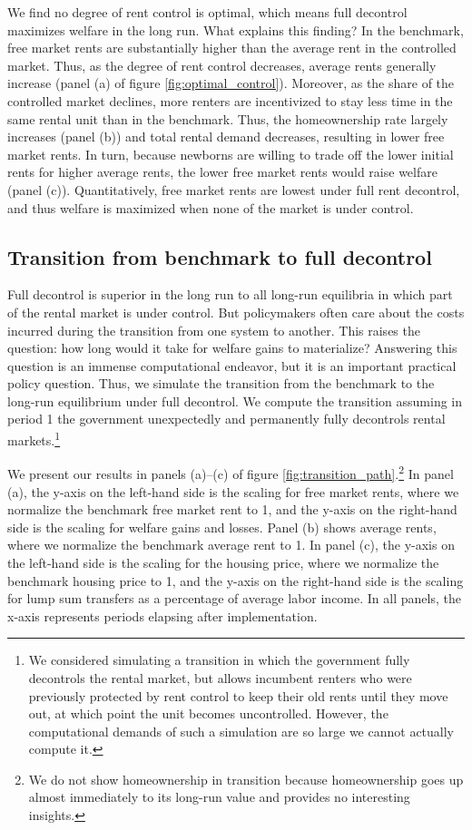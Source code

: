 \documentclass[parskip=full]{article}
\begin{document}
We find no degree of rent control is optimal, which means full decontrol maximizes welfare in the long run. What explains this finding? In the benchmark, free market rents are substantially higher than the average rent in the controlled market. Thus, as the degree of rent control decreases, average rents generally increase (panel (a) of figure \ref{fig:optimal_control}). Moreover, as the share of the controlled market declines, more renters are incentivized to stay less time in the same rental unit than in the benchmark. Thus, the homeownership rate largely increases (panel (b)) and total rental demand decreases, resulting in lower free market rents. In turn, because newborns are willing to trade off the lower initial rents for higher average rents, the lower free market rents would raise welfare (panel (c)). Quantitatively, free market rents are lowest under full rent decontrol, and thus welfare is maximized when none of the market is under control.

\subsection{Transition from benchmark to full decontrol}\label{subsection:transition}

Full decontrol is superior in the long run to all long-run equilibria in which part of the rental market is under control. But policymakers often care about the costs incurred during the transition from one system to another. This raises the question: how long would it take for welfare gains to materialize? Answering this question is an immense computational endeavor, but it is an important practical policy question. Thus, we simulate the transition from the benchmark to the long-run equilibrium under full decontrol. We compute the transition assuming in period 1 the government unexpectedly and permanently fully decontrols rental markets.\footnote{We considered simulating a transition in which the government fully decontrols the rental market, but allows incumbent renters who were previously protected by rent control to keep their old rents until they move out, at which point the unit becomes uncontrolled. However, the computational demands of such a simulation are so large we cannot actually compute it.}

We present our results in panels (a)--(c) of figure \ref{fig:transition_path}.\footnote{We do not show homeownership in transition because homeownership goes up almost immediately to its long-run value and provides no interesting insights.} In panel (a), the y-axis on the left-hand side is the scaling for free market rents, where we normalize the benchmark free market rent to 1, and the y-axis on the right-hand side is the scaling for welfare gains and losses. Panel (b) shows average rents, where we normalize the benchmark average rent to 1. In panel (c), the y-axis on the left-hand side is the scaling for the housing price, where we normalize the benchmark housing price to 1, and the y-axis on the right-hand side is the scaling for lump sum transfers as a percentage of average labor income. In all panels, the x-axis represents periods elapsing after implementation.
\end{document}
